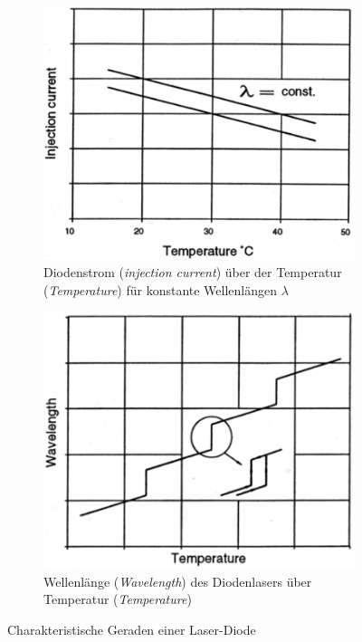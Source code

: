 \documentclass[numbers=noenddot,12pt,a4paper]{scrartcl}
\newcommand{\tilt}[1]{\textit{#1}}
\begin{document}
\begin{figure}[H]
	\begin{subfigure}[htbp]{0.45\textwidth}
		\includegraphics[width=\textwidth]{stromT.png}
		\caption{Diodenstrom (\tilt{injection current}) über der Temperatur (\tilt{Temperature}) für konstante Wellenlängen $\lambda$}\label{img:stromt}
	\end{subfigure}
	\hspace{0.5cm}
	\begin{subfigure}[htbp]{0.45\textwidth}
		\vspace{-0.9cm}
		\includegraphics[width=\textwidth]{lambdaT.png}
		\caption{Wellenlänge (\tilt{Wavelength}) des Diodenlasers über Temperatur (\tilt{Temperature})}\label{img:lambdat}
	\end{subfigure}
	\caption{Charakteristische Geraden einer Laser-Diode}
	\label{img:diodechar}
\end{figure}
\end{document}
